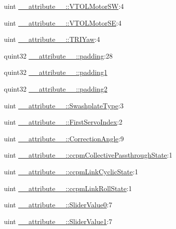 \begin{DoxyCompactItemize}
\item 
uint \hyperlink{group___config_plugin_ga6c7dfd25d7944b3ce84871fed9c6c9ef}{\-\_\-\-\_\-attribute\-\_\-\-\_\-\-::\-V\-T\-O\-L\-Motor\-S\-W}\-:4
\item 
uint \hyperlink{group___config_plugin_gaa954495952cf0b6ae1f8a25d95ca09c0}{\-\_\-\-\_\-attribute\-\_\-\-\_\-\-::\-V\-T\-O\-L\-Motor\-S\-E}\-:4
\item 
uint \hyperlink{group___config_plugin_ga63632c414ddd0db93282a775cff6ee2b}{\-\_\-\-\_\-attribute\-\_\-\-\_\-\-::\-T\-R\-I\-Yaw}\-:4
\item 
quint32 \hyperlink{group___config_plugin_gae439ab85c005f3400498997049fd50e8}{\-\_\-\-\_\-attribute\-\_\-\-\_\-\-::padding}\-:28
\item 
quint32 \hyperlink{group___config_plugin_ga1d4a76a1f0c36316d50d1ae3f788ef4e}{\-\_\-\-\_\-attribute\-\_\-\-\_\-\-::padding1}
\item 
quint32 \hyperlink{group___config_plugin_ga445d386b31eb43aafbd971345a5b221e}{\-\_\-\-\_\-attribute\-\_\-\-\_\-\-::padding2}
\item 
uint \hyperlink{group___config_plugin_ga4f96550cdd283e7bb8b8fb7ec7d3cc09}{\-\_\-\-\_\-attribute\-\_\-\-\_\-\-::\-Swashplate\-Type}\-:3
\item 
uint \hyperlink{group___config_plugin_ga7db78067a379a075d4ead422019337d3}{\-\_\-\-\_\-attribute\-\_\-\-\_\-\-::\-First\-Servo\-Index}\-:2
\item 
uint \hyperlink{group___config_plugin_ga9540a6905aee7cc229adfd3bd687b86a}{\-\_\-\-\_\-attribute\-\_\-\-\_\-\-::\-Correction\-Angle}\-:9
\item 
uint \hyperlink{group___config_plugin_ga14bffa0ebae107df7ec9a9b6e06294a9}{\-\_\-\-\_\-attribute\-\_\-\-\_\-\-::ccpm\-Collective\-Passthrough\-State}\-:1
\item 
uint \hyperlink{group___config_plugin_ga31785760b6dab4f2006d4824ef4b7e5b}{\-\_\-\-\_\-attribute\-\_\-\-\_\-\-::ccpm\-Link\-Cyclic\-State}\-:1
\item 
uint \hyperlink{group___config_plugin_gaecc16f8488db13ba16c2c6e1d0053239}{\-\_\-\-\_\-attribute\-\_\-\-\_\-\-::ccpm\-Link\-Roll\-State}\-:1
\item 
uint \hyperlink{group___config_plugin_ga2787c0bb4ab205071860d7a5c90cb7a6}{\-\_\-\-\_\-attribute\-\_\-\-\_\-\-::\-Slider\-Value0}\-:7
\item 
uint \hyperlink{group___config_plugin_gab1ae7499273b5e51087ce2da94c0acab}{\-\_\-\-\_\-attribute\-\_\-\-\_\-\-::\-Slider\-Value1}\-:7
\item 

\end{DoxyCompactItemize}
